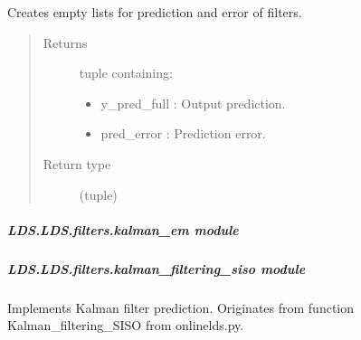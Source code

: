 \documentclass[letterpaper,10pt,english]{sphinxmanual}
\begin{document}
\begin{fulllineitems}
\begin{fulllineitems}
\label{\detokenize{LDS.LDS.filters:LDS.LDS.filters.filtering_siso.FilteringSiso.predict}}
\sphinxAtStartPar
Creates empty lists for prediction and error of filters.
\begin{quote}\begin{description}
\item[{Returns}] \leavevmode
\sphinxAtStartPar

\sphinxAtStartPar
tuple containing:
\begin{itemize}
\item {} 
\sphinxAtStartPar
y\_pred\_full : Output prediction.

\item {} 
\sphinxAtStartPar
pred\_error  : Prediction error.

\end{itemize}


\item[{Return type}] \leavevmode
\sphinxAtStartPar
(tuple)

\end{description}\end{quote}

\end{fulllineitems}


\end{fulllineitems}



\subparagraph{LDS.LDS.filters.kalman\_em module}
\label{\detokenize{LDS.LDS.filters:module-LDS.LDS.filters.kalman_em}}\label{\detokenize{LDS.LDS.filters:lds-lds-filters-kalman-em-module}}

\subparagraph{LDS.LDS.filters.kalman\_filtering\_siso module}
\label{\detokenize{LDS.LDS.filters:module-LDS.LDS.filters.kalman_filtering_siso}}\label{\detokenize{LDS.LDS.filters:lds-lds-filters-kalman-filtering-siso-module}}
\sphinxAtStartPar
Implements Kalman filter prediction.
Originates from function Kalman\_filtering\_SISO from onlinelds.py.
\end{document}
